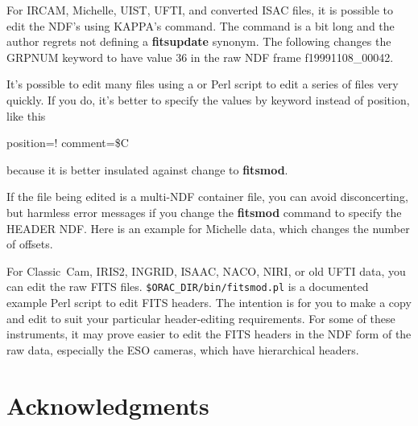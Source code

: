 \documentclass[twoside,11pt,nolof]{starlink}
\providecommand{\KAPPA}{{\footnotesize KAPPA}}
\begin{document}
For IRCAM, Michelle, UIST, UFTI, and converted ISAC files, it is
possible to edit the NDF's
 using \KAPPA's
 command.  The command is a bit
long and the author regrets not defining a \textbf{fitsupdate} synonym.
The following changes the GRPNUM keyword to have value 36 in the raw
NDF frame f19991108\_00042.

\begin{terminalv}
\end{terminalv}

It's possible to edit many files using a  or Perl
script to edit a series of files very quickly.  If you do, it's better
to specify the values by keyword instead of position, like this

\begin{terminalv}
                position=! comment=\$C
\end{terminalv}
because it is better insulated against change to \textbf{fitsmod}.

If the file being edited is a multi-NDF container file, you can avoid
disconcerting, but harmless error messages if you change the \textbf{fitsmod} command to specify the HEADER NDF.  Here is an example for
Michelle data, which changes the number of offsets.

\begin{terminalv}
\end{terminalv}

For Classic~Cam, IRIS2, INGRID, ISAAC, NACO, NIRI, or old UFTI data, you can edit
the raw FITS files.  {\tt\$ORAC\_DIR/bin/fitsmod.pl} is a documented
example Perl script to edit FITS headers.  The intention is for you to
make a copy and edit to suit your particular header-editing
requirements.  For some of these instruments, it may prove easier to
edit the FITS headers in the NDF form of the raw data, especially
the ESO cameras, which have hierarchical headers.

\section{Acknowledgments}
\end{document}
